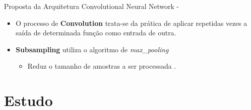 \documentclass[aspectratio=169, xcolor=dvipsnames]{beamer}
\let\olditem=\item%
\renewcommand{\item}{\olditem \justifying}
\begin{document}
\begin{frame}[allowframebreaks]{Proposta da Arquitetura Convolutional Neural Network -}
\begin{itemize}
				\item O processo de \textbf{Convolution} trata-se da prática de aplicar repetidas vezes a saída de determinada função como entrada de outra.

				\item \textbf{Subsampling} utiliza o algoritmo de \textit{max\_pooling}
				\begin{itemize}
					\item  Reduz o tamanho de amostras a ser processada \cite{Giusti2013}.
				\end{itemize}
			\end{itemize}
		\end{frame}


\section{Estudo} \label{sec:desenvolvimento}
\end{document}
